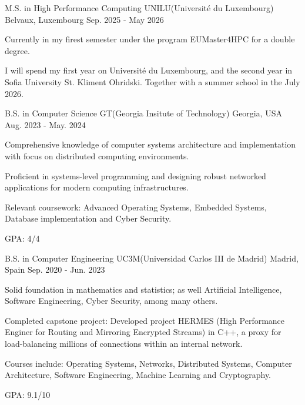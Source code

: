 

\begin{cventries}

  \cventry
    {M.S. in High Performance Computing} %
    {UNILU(Université du Luxembourg)} %
    {Belvaux, Luxembourg} %
    {Sep. 2025 - May 2026} %
    {
      \begin{cvitems} %
        \item {Currently in my firest semester under the program EUMaster4HPC for a double degree.}
        \item {I will spend my first year on Université du Luxembourg, and the second year in Sofia University St. Kliment Ohridski. Together with a summer school in the July 2026.}
      \end{cvitems}
    }

  \cventry
    {B.S. in Computer Science} %
    {GT(Georgia Insitute of Technology)} %
    {Georgia, USA} %
    {Aug. 2023 - May. 2024} %
    {
      \begin{cvitems} %
        \item {Comprehensive knowledge of computer systems architecture and implementation with focus on distributed computing environments.}
        \item {Proficient in systems-level programming and designing robust networked applications for modern computing infrastructures.}
        \item {Relevant coursework: Advanced Operating Systems, Embedded Systems, Database implementation and Cyber Security.}
        \item {GPA: 4/4}
      \end{cvitems}
    }
  \cventry
    {B.S. in Computer Engineering} %
    {UC3M(Universidad Carlos III de Madrid)} %
    {Madrid, Spain} %
    {Sep. 2020 - Jun. 2023} %
    {
      \begin{cvitems} %
        \item {Solid foundation in mathematics and statistics; as well Artificial Intelligence, Software Engineering, Cyber Security, among many others.}
        \item {Completed capstone project: Developed project HERMES (High Performance Enginer for Routing and Mirroring Encrypted Streams) in C++, a proxy for load-balancing millions of connections within an internal network.}
        \item {Courses include: Operating Systems, Networks, Distributed Systems, Computer Architecture, Software Engineering, Machine Learning and Cryptography.}
        \item {GPA: 9.1/10}
      \end{cvitems}
    }


\end{cventries}
